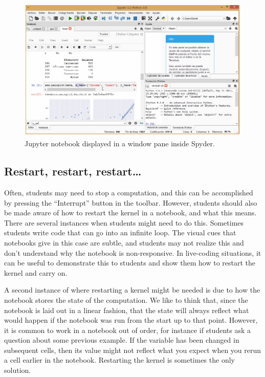 \documentclass[]{book}
\begin{document}
\begin{figure}
\centering
\includegraphics{images/chapter54.png}
\caption{Jupyter notebook displayed in a window pane inside Spyder.}
\end{figure}

\hypertarget{restart-restart-restart}{%
\subsection{Restart, restart, restart\ldots{}}\label{restart-restart-restart}}

Often, students may need to stop a computation, and this can be
accomplished by pressing the ``Interrupt'' button in the
toolbar. However, students should also be made aware of how to restart
the kernel in a notebook, and what this means. There are several
instances when students might need to do this. Sometimes students
write code that can go into an infinite loop. The visual cues that
notebooks give in this case are subtle, and students may not realize
this and don't understand why the notebook is non-responsive. In
live-coding situations, it can be useful to demonstrate this to
students and show them how to restart the kernel and carry on.

A second instance of where restarting a kernel might be needed is due
to how the notebook stores the state of the computation. We like to
think that, since the notebook is laid out in a linear fashion, that
the state will always reflect what would happen if the notebook was
run from the start up to that point. However, it is common to work in
a notebook out of order, for instance if students ask a question about
some previous example. If the variable has been changed in subsequent
cells, then its value might not reflect what you expect when you rerun
a cell earlier in the notebook. Restarting the kernel is sometimes the
only solution.
\end{document}
